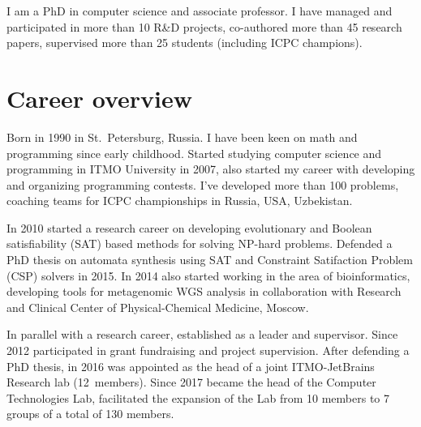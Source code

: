 \documentclass[11pt,a4paper,sans]{moderncv}        %
\begin{document}
\makecvtitle

I am a PhD in computer science and associate professor.
I have managed and participated in more than 10 R\&D projects, 
co-authored more than 45 research papers, 
supervised more than 25 students (including ICPC champions).
\smallskip



\section{Career overview}
Born in 1990 in St.~Petersburg, Russia. I have been keen on math and programming since early childhood.
Started studying computer science and programming in ITMO University in 2007, also started my career with
developing and organizing programming contests. 
I've developed more than 100 problems, coaching teams for ICPC championships in Russia, USA, Uzbekistan.
\smallskip

In 2010 started a research career on developing evolutionary and 
Boolean satisfiability (SAT) based methods for solving NP-hard problems.
Defended a PhD thesis on automata synthesis using SAT and Constraint Satifaction Problem (CSP) solvers in 2015.
In 2014 also started working in the area of bioinformatics, developing tools 
for metagenomic WGS analysis in collaboration with Research and Clinical Center of Physical-Chemical Medicine, Moscow.
\smallskip

In parallel with a research career, established as a leader and supervisor.
Since 2012 participated in grant fundraising and project supervision.
After defending a PhD thesis, in 2016 was appointed as the head of a joint ITMO-JetBrains Research lab (12~members).
Since 2017 became the head of the Computer Technologies Lab, facilitated the 
expansion of the Lab from 10 members to 7 groups of a total of 130 members.
\end{document}
